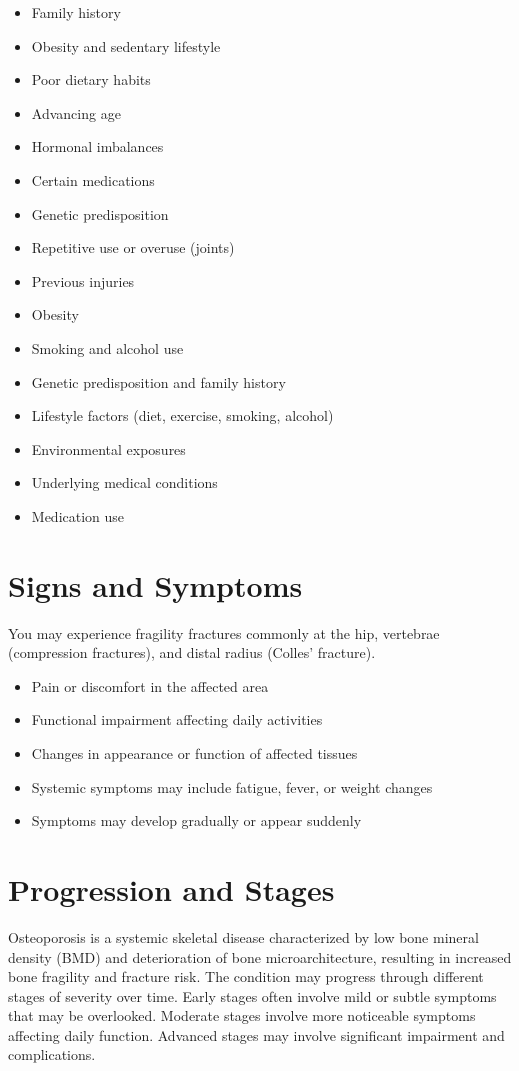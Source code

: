 \begin{itemize}[noitemsep]
  \item Family history
  \item Obesity and sedentary lifestyle
  \item Poor dietary habits
  \item Advancing age
  \item Hormonal imbalances
  \item Certain medications
  \item Genetic predisposition
  \item Repetitive use or overuse (joints)
  \item Previous injuries
  \item Obesity
  \item Smoking and alcohol use
  \item Genetic predisposition and family history
  \item Lifestyle factors (diet, exercise, smoking, alcohol)
  \item Environmental exposures
  \item Underlying medical conditions
  \item Medication use
\end{itemize}
\section{Signs and Symptoms}
You may experience fragility fractures commonly at the hip, vertebrae (compression fractures), and distal radius (Colles' fracture).

\begin{itemize}[noitemsep]
  \item Pain or discomfort in the affected area
  \item Functional impairment affecting daily activities
  \item Changes in appearance or function of affected tissues
  \item Systemic symptoms may include fatigue, fever, or weight changes
  \item Symptoms may develop gradually or appear suddenly
\end{itemize}
\section{Progression and Stages}
Osteoporosis is a systemic skeletal disease characterized by low bone mineral density (BMD) and deterioration of bone microarchitecture, resulting in increased bone fragility and fracture risk. The condition may progress through different stages of severity over time. Early stages often involve mild or subtle symptoms that may be overlooked. Moderate stages involve more noticeable symptoms affecting daily function. Advanced stages may involve significant impairment and complications.
